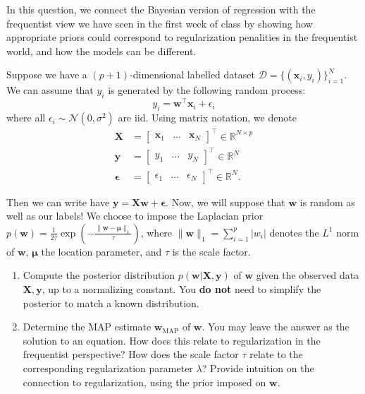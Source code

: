 \documentclass[submit]{harvardml}
\begin{document}
\begin{problem}
    In this question, we connect the Bayesian version of regression with the frequentist view we have seen in the first week of class by showing how appropriate priors could correspond to regularization penalities in the frequentist world, and how the models can be different.
    
    Suppose we have a $(p+1)$-dimensional labelled dataset $\mathcal{D} = \{(\mathbf{x}_i, y_i)\}_{i=1}^N$. We can assume that $y_i$ is generated by the following random process: $$y_i = \mathbf{w}^\top\mathbf{x}_i + \epsilon_i$$ where all $\epsilon_i \sim \mathcal{N}(0,\sigma^2)$ are iid. Using matrix notation, we denote
    \begin{align*}
      \mathbf{X} &= \begin{bmatrix}\mathbf{x}_1 & \ldots & \mathbf{x}_N\end{bmatrix}^\top \in \mathbb{R}^{N \times p} \\
      \mathbf{y} &= \begin{bmatrix} y_1 & \dots & y_N \end{bmatrix}^\top  \in \mathbb{R}^N \\
      \mathbf{\epsilon} &= \begin{bmatrix} \epsilon_1 & \dots & \epsilon_N \end{bmatrix}^\top \in \mathbb{R}^N.
    \end{align*}
    
    Then we can write have $\mathbf{y} = \mathbf{X}\mathbf{w} + \mathbf{\epsilon}$. Now, we will suppose that $\mathbf{w}$ is random as well as our labels! We choose to impose the Laplacian prior $p(\mathbf{w})=\frac{1}{2\tau}\exp\left(-\frac{\|\mathbf{w}-\mathbf{\mu}\|_1}{\tau}\right)$, where $\|\mathbf{w}\|_1=\sum_{i=1}^p |w_i|$ denotes the $L^1$ norm of $\mathbf{w}$, $\mathbf{\mu}$ the location parameter, and $\tau$ is the scale factor.
    
    \begin{enumerate}
    
        \item Compute the posterior distribution $p(\mathbf{w}|\mathbf{X}, \mathbf{y})$ of $\mathbf{w}$ given the observed data $\mathbf{X}, \mathbf{y}$, up to a normalizing constant. You \textbf{do not} need to simplify the posterior to match a known distribution.
        
        \item Determine the MAP estimate $\mathbf{w}_{\mathrm{MAP}}$ of $\mathbf{w}$. You may leave the answer as the solution to an equation. How does this relate to regularization in the frequentist perspective? How does the scale factor $\tau$ relate to the corresponding regularization parameter $\lambda$? Provide intuition on the connection to regularization, using the prior imposed on $\mathbf{w}$.
        

\end{enumerate}
\end{problem}
\end{document}
